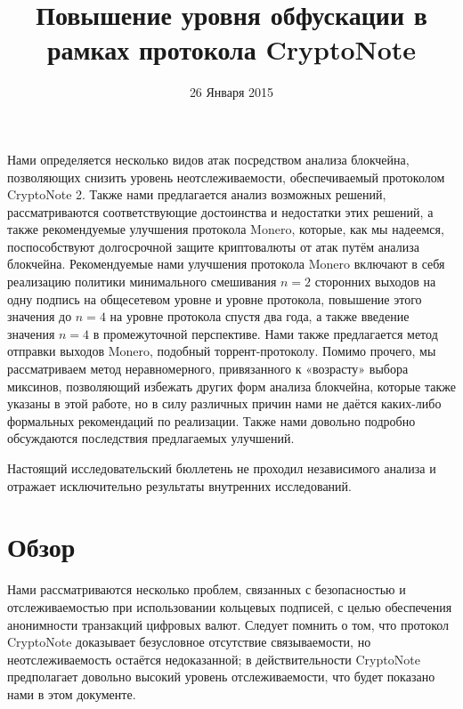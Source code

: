 \documentclass{mrl}
\title{Повышение уровня обфускации в рамках протокола CryptoNote}
\date{26 Января 2015}
\begin{document}
\begin{center}
{}
\end{center}

Нами определяется несколько видов атак посредством анализа блокчейна, позволяющих снизить уровень неотслеживаемости, обеспечиваемый протоколом CryptoNote 2. Также нами предлагается анализ возможных решений, рассматриваются соответствующие достоинства и недостатки этих решений, а также рекомендуемые улучшения протокола Monero, которые, как мы надеемся, поспособствуют долгосрочной защите криптовалюты от атак путём анализа блокчейна. Рекомендуемые нами улучшения протокола Monero включают в себя реализацию политики минимального смешивания $n=2$ сторонних выходов на одну подпись на общесетевом уровне и уровне протокола, повышение этого значения до $n=4$ на уровне протокола спустя два года, а также введение значения $n=4$ в промежуточной перспективе. Нами также предлагается метод отправки выходов Monero, подобный торрент-протоколу. Помимо прочего, мы рассматриваем метод неравномерного, привязанного к «возрасту» выбора миксинов, позволяющий избежать других форм анализа блокчейна, которые также указаны в этой работе, но в силу различных причин нами не даётся каких-либо формальных рекомендаций по реализации. Также нами довольно подробно обсуждаются последствия предлагаемых улучшений.

Настоящий исследовательский бюллетень не проходил независимого анализа и отражает исключительно результаты внутренних исследований.

\section{Обзор}\label{overview}
Нами рассматриваются несколько проблем, связанных с безопасностью и отслеживаемостью при использовании кольцевых подписей, с целью обеспечения анонимности транзакций цифровых валют. Следует помнить о том, что протокол CryptoNote доказывает безусловное отсутствие связываемости, но неотслеживаемость остаётся недоказанной; в действительности CryptoNote предполагает довольно высокий уровень отслеживаемости, что будет показано нами в этом документе.
\end{document}

